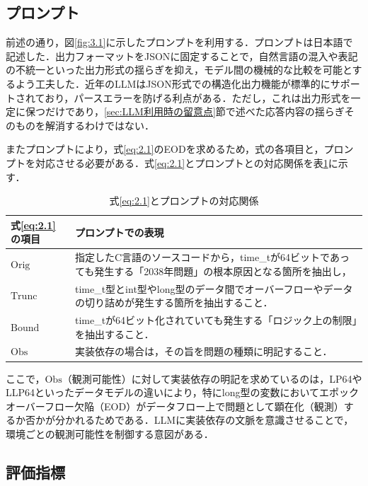 \documentclass[submit,techrep,noauthor]{ipsj-lualatex}
\begin{document}
\subsection{プロンプト}

前述の通り，図\ref{fig:3.1}に示したプロンプトを利用する．プロンプトは日本語で記述した．出力フォーマットをJSON\cite{ref8}に固定することで，自然言語の混入や表記の不統一といった出力形式の揺らぎを抑え，モデル間の機械的な比較を可能とするよう工夫した．近年のLLMはJSON形式での構造化出力機能が標準的にサポートされており\cite{ref9}，パースエラーを防げる利点がある．ただし，これは出力形式を一定に保つだけであり，\ref{sec:LLM利用時の留意点}節で述べた応答内容の揺らぎそのものを解消するわけではない．

またプロンプトにより，式\ref{eq:2.1}のEODを求めるため，式の各項目と，プロンプトを対応させる必要がある．式\ref{eq:2.1}とプロンプトとの対応関係を表\ref{tab:4.1}に示す．

\begin{table}[bt]
	\centering
	\caption{式\ref{eq:2.1}とプロンプトの対応関係}
	\label{tab:4.1}
	\begin{tabular}{|l|p{5cm}|}
\hline
\textbf{式\ref{eq:2.1}の項目} & \textbf{プロンプトでの表現} \\
\hline
$\mathrm{Orig}$ & 指定したC言語のソースコードから，time\_tが64ビットであっても発生する「2038年問題」の根本原因となる箇所を抽出し， \\
\hline
$\mathrm{Trunc}$ & time\_t型とint型やlong型のデータ間でオーバーフローやデータの切り詰めが発生する箇所を抽出すること． \\
\hline
$\mathrm{Bound}$ & time\_tが64ビット化されていても発生する「ロジック上の制限」を抽出すること． \\
\hline
$\mathrm{Obs}$ & 実装依存の場合は，その旨を問題の種類に明記すること． \\
\hline
\end{tabular}
\end{table}

ここで，$\mathrm{Obs}$（観測可能性）に対して実装依存の明記を求めているのは，LP64やLLP64といったデータモデルの違いにより，特にlong型の変数においてエポックオーバーフロー欠陥（EOD）がデータフロー上で問題として顕在化（観測）するか否かが分かれるためである．LLMに実装依存の文脈を意識させることで，環境ごとの観測可能性を制御する意図がある．

\subsection{評価指標}
\end{document}
